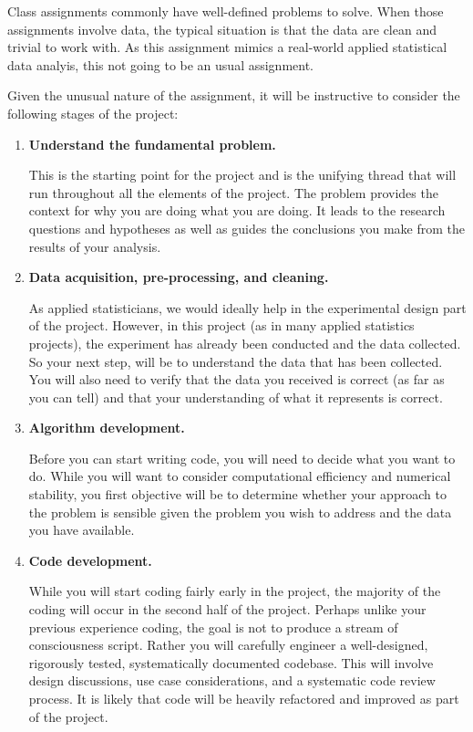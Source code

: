 \documentclass[11pt, oneside]{article}   	%
\begin{document}
Class assignments commonly have well-defined problems to solve.  When those
assignments involve data, the typical situation is that the data are clean and
trivial to work with.  As this assignment mimics a real-world applied
statistical data analyis, this not going to be an usual assignment.

Given the unusual nature of the assignment, it will be instructive to consider
the following stages of the project:

\begin{enumerate}

\item \textbf{Understand the fundamental problem.}

This is the starting point for the project and is the unifying thread that will
run throughout all the elements of the project.  The problem provides the
context for why you are doing what you are doing.  It leads to the research questions
and hypotheses as well as guides the conclusions you make from the results of
your analysis.

\item \textbf{Data acquisition, pre-processing, and cleaning.}

As applied statisticians, we would ideally help in the experimental design part
of the project.  However, in this project (as in many applied statistics
projects), the experiment has already been conducted and the data collected.
So your next step, will be to understand the data that has been collected.  You
will also need to verify that the data you received is correct (as far as you
can tell) and that your understanding of what it represents is correct.

\item \textbf{Algorithm development.}

Before you can start writing code, you will need to decide what you want to do.
While you will want to consider computational efficiency and numerical
stability, you first objective will be to determine whether your approach to
the problem is sensible given the problem you wish to address and the data you
have available.

\item \textbf{Code development.}

While you will start coding fairly early in the project, the majority of the
coding will occur in the second half of the project.  Perhaps unlike your
previous experience coding, the goal is not to produce a stream of
consciousness script.  Rather you will carefully engineer a well-designed,
rigorously tested, systematically documented codebase.  This will involve
design discussions, use case considerations, and a systematic code review
process.  It is likely that code will be heavily refactored and improved as
part of the project.


\end{enumerate}
\end{document}
